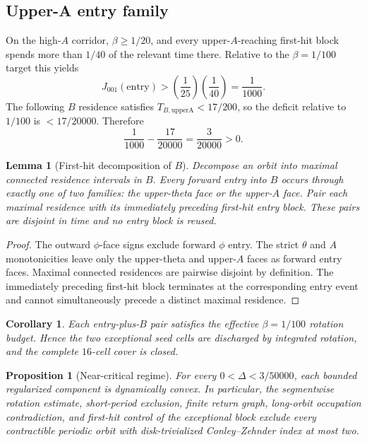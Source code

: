 \documentclass[11pt]{article}
\newtheorem{lemma}[theorem]{Lemma}
\newtheorem{corollary}[theorem]{Corollary}
\newtheorem{proposition}[theorem]{Proposition}
\begin{document}
\subsection{Upper-A entry family}
On the high-$A$ corridor, $\beta\ge1/20$, and every upper-$A$-reaching first-hit block spends more than $1/40$ of the relevant time there. Relative to the $\beta=1/100$ target this yields
\[
J_{001}(\mathrm{entry})>\left(\frac1{25}\right)\left(\frac1{40}\right)=\frac1{1000}.
\]
The following $B$ residence satisfies $T_{B,\mathrm{upperA}}<17/200$, so the deficit relative to $1/100$ is $<17/20000$. Therefore
\[
\frac1{1000}-\frac{17}{20000}=\frac3{20000}>0.
\]

\begin{lemma}[First-hit decomposition of $B$]\label{lem:first-hit}
Decompose an orbit into maximal connected residence intervals in $B$. Every forward entry into $B$ occurs through exactly one of two families: the upper-theta face or the upper-$A$ face. Pair each maximal residence with its immediately preceding first-hit entry block. These pairs are disjoint in time and no entry block is reused.
\end{lemma}

\begin{proof}
The outward $\phi$-face signs exclude forward $\phi$ entry. The strict $\theta$ and $A$ monotonicities leave only the upper-theta and upper-$A$ faces as forward entry faces. Maximal connected residences are pairwise disjoint by definition. The immediately preceding first-hit block terminates at the corresponding entry event and cannot simultaneously precede a distinct maximal residence.
\end{proof}

\begin{corollary}
Each entry-plus-$B$ pair satisfies the effective $\beta=1/100$ rotation budget. Hence the two exceptional seed cells are discharged by integrated rotation, and the complete $16$-cell cover is closed.
\end{corollary}

\begin{proposition}[Near-critical regime]\label{prop:near}
For every $0<\Delta<3/50000$, each bounded regularized component is dynamically convex. In particular, the segmentwise rotation estimate, short-period exclusion, finite return graph, long-orbit occupation contradiction, and first-hit control of the exceptional block exclude every contractible periodic orbit with disk-trivialized Conley--Zehnder index at most two.
\end{proposition}
\end{document}
